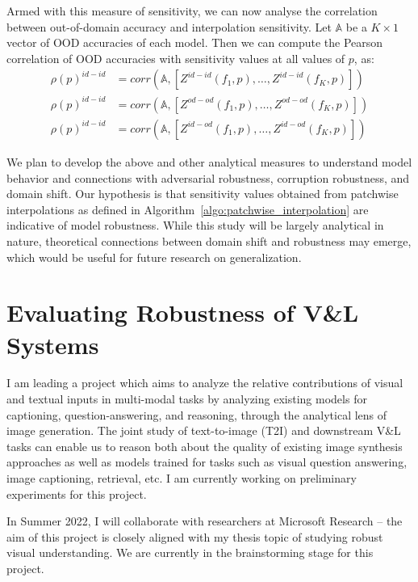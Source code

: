 Armed with this measure of sensitivity, we can now analyse the correlation between out-of-domain accuracy and interpolation sensitivity.
Let $\mathbb{A}$ be a $K\times 1$ vector of OOD accuracies of each model.
Then we can compute the Pearson correlation of OOD accuracies with sensitivity values at all values of $p$, as:
\begin{align}
    \rho(p)^{id-id} &= corr(\mathbb{A}, [Z^{id-id}(f_1, p), \dots, Z^{id-id}(f_K, p)])\\
    \rho(p)^{id-id} &= corr(\mathbb{A}, [Z^{od-od}(f_1, p), \dots, Z^{od-od}(f_K, p)])\\
    \rho(p)^{id-id} &= corr(\mathbb{A}, [Z^{id-od}(f_1, p), \dots, Z^{id-od}(f_K, p)])
    \label{eq:correlation}
\end{align}

We plan to develop the above and other analytical measures to understand model behavior and connections with adversarial robustness, corruption robustness, and domain shift.
Our hypothesis is that sensitivity values obtained from patchwise interpolations as defined in Algorithm~\ref{algo:patchwise_interpolation} are indicative of model robustness.
While this study will be largely analytical in nature, theoretical connections between domain shift and robustness may emerge, which would be useful for future research on generalization.


\section{Evaluating Robustness of V\&L Systems}
I am leading a project which aims to analyze the relative contributions of visual and textual inputs in multi-modal tasks by analyzing existing models for captioning, question-answering, and reasoning, through the analytical lens of image generation.
The joint study of text-to-image (T2I) and downstream V\&L tasks can enable us to reason both about the quality of existing image synthesis approaches as well as models trained for tasks such as visual question answering, image captioning, retrieval, etc.
I am currently working on preliminary experiments for this project.

In Summer 2022, I will collaborate with researchers at Microsoft Research -- the aim of this project is closely aligned with my thesis topic of studying robust visual understanding.
We are currently in the brainstorming stage for this project.

